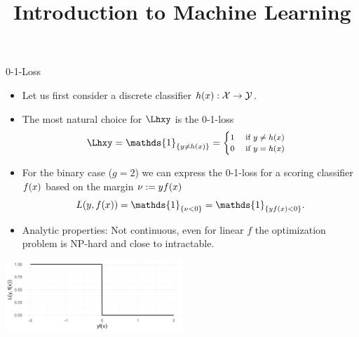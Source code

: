 




\newcommand{\titlefigure}{figure/plot_loss_01.png}
\newcommand{\learninggoals}{
  \item Derive the risk minimizer of the 0-1-loss
  \item Derive the optimal constant model for the 0-1-loss
}

\title{Introduction to Machine Learning}
\date{}






\begin{vbframe}{0-1-Loss}

\begin{itemize}
  \item Let us first consider a discrete classifier $h(x): \mathcal{X} \to \mathcal{Y}$. 
  \item The most natural choice for $\Lhxy$ is the 0-1-loss 
  \vspace*{-0.2cm}
  $$
  \Lhxy = \mathds{1}_{\{y \ne \hx\}} =
     \footnotesize \begin{cases} 1 \quad \text{ if } y \ne \hx \\ 0 \quad    \text{ if } y = \hx  \end{cases}
  $$
  \item For the binary case ($g = 2$) we can express the 0-1-loss for a scoring classifier $f(x)$ based on the margin $\nu := yf(x)$
  \vspace*{-0.2cm}
  $$
  \Lxy = \mathds{1}_{\{\nu < 0\}} = \mathds{1}_{\{y\fx < 0\}}. 
  $$
  \item Analytic properties:  Not continuous, even for linear $f$ the optimization problem is NP-hard and close to intractable.
\end{itemize}

\begin{center}
\includegraphics[width = 0.5\textwidth]{figure/plot_loss_01.png}
\end{center}

\end{vbframe}


